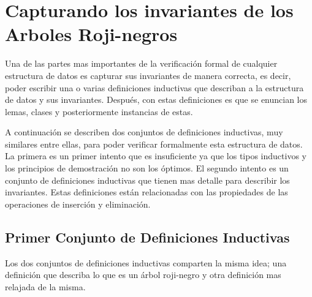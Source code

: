 \documentclass[letterpaper,12pt,oneside]{book}
\newcommand{\Arns}{Arboles Roji-negros}
\newcommand{\arn}{árbol roji-negro}
\theoremstyle{plain}
\theoremstyle{definition}
\theoremstyle{remark}
\begin{document}
\section{Capturando los invariantes de los {\Arns}}
Una de las partes mas importantes de la verificaci\'on formal de cualquier estructura de datos es 
capturar sus invariantes de manera correcta, es decir, poder escribir una o varias definiciones 
inductivas que describan a la estructura de datos y sus invariantes. Después, con estas 
definiciones es que se enuncian los lemas, clases y posteriormente instancias de estas. 

A continuaci\'on se describen dos conjuntos de definiciones inductivas, muy similares entre ellas, para 
poder verificar formalmente esta estructura de datos. La primera es un primer intento que es insuficiente
ya que los tipos inductivos y los principios de demostraci\'on no son los \'optimos. El segundo intento 
es un conjunto de definiciones inductivas que tienen mas detalle para describir los invariantes. Estas 
definiciones est\'an relacionadas con las propiedades de las operaciones de inserci\'on y eliminaci\'on. 

\subsection{Primer Conjunto de Definiciones Inductivas}
Los dos conjuntos de definiciones inductivas comparten la misma idea; una definici\'on que describa lo 
que es un {\arn} y otra definici\'on mas relajada de la misma.
\end{document}
